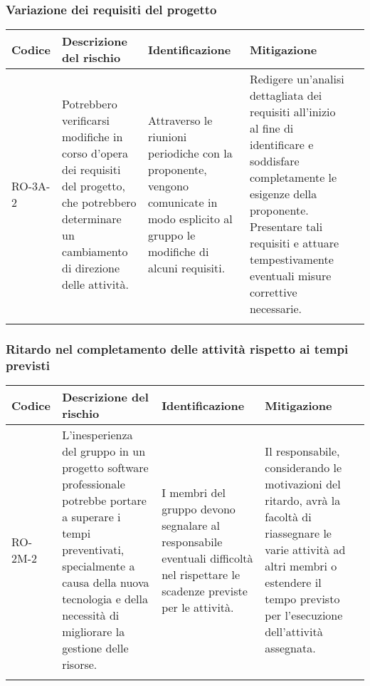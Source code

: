 \subsubsection{Variazione dei requisiti del progetto}
\begin{table}[h]
    \centering
    \begin{tabularx}{\textwidth}{l>{\RaggedRight}X>{\RaggedRight}X>{\RaggedRight}X>{\RaggedRight}X}
    \toprule
    \rowcolor{gray!50}
    \textbf{Codice} & \textbf{Descrizione del rischio} & \textbf{Identificazione} & \textbf{Mitigazione} \\
    \midrule
    \addlinespace 
    RO-3A-2 & 
    Potrebbero verificarsi modifiche in corso d'opera dei requisiti del progetto, che potrebbero determinare un cambiamento di direzione delle attività. &
    Attraverso le riunioni periodiche con la proponente, vengono comunicate in modo esplicito al gruppo le modifiche di alcuni requisiti.&
    Redigere un'analisi dettagliata dei requisiti all'inizio al fine di identificare e soddisfare completamente le esigenze della proponente. Presentare tali requisiti e attuare tempestivamente eventuali misure correttive necessarie. \\
    \bottomrule
    \addlinespace 
    \end{tabularx}
\end{table}

\newpage
\subsubsection{Ritardo nel completamento delle attività rispetto ai tempi previsti}
\begin{table}[h]
    \centering
    \begin{tabularx}{\textwidth}{l>{\RaggedRight}X>{\RaggedRight}X>{\RaggedRight}X>{\RaggedRight}X}
    \toprule
    \rowcolor{gray!50}
    \textbf{Codice} & \textbf{Descrizione del rischio} & \textbf{Identificazione} & \textbf{Mitigazione} \\
    \midrule
    \addlinespace 
    RO-2M-2 & 
    L'inesperienza del gruppo in un progetto software professionale potrebbe portare a superare i tempi preventivati, specialmente a causa della nuova tecnologia e della necessità di migliorare la gestione delle risorse.& 
    I membri del gruppo devono segnalare al responsabile eventuali difficoltà nel rispettare le scadenze previste per le attività. &
    Il responsabile, considerando le motivazioni del ritardo, avrà la facoltà di riassegnare le varie attività ad altri membri o estendere il tempo previsto per l'esecuzione dell'attività assegnata. \\
    \bottomrule
    \addlinespace 
    \end{tabularx}
\end{table}

